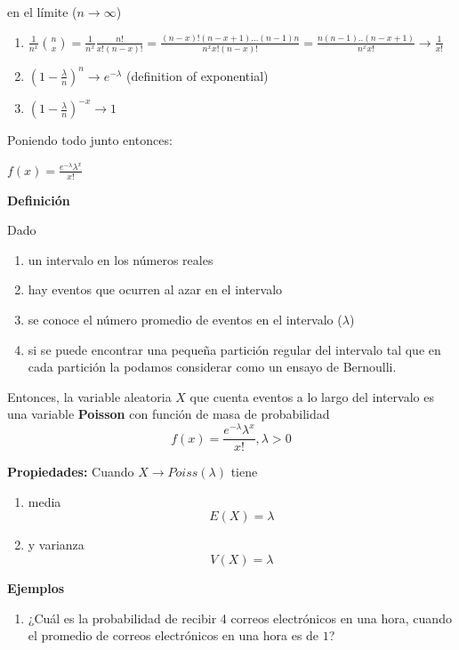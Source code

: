 \documentclass[
]{book}
\providecommand{\tightlist}{%
  \setlength{\itemsep}{0pt}\setlength{\parskip}{0pt}}
\begin{document}
en el límite (\(n \rightarrow \infty\))

\begin{enumerate}
\def\labelenumi{\arabic{enumi})}
\tightlist
\item
  \(\frac{1}{n^x}\binom n x =\frac{1}{n^x}\frac{n!}{x! (n-x)!}=\frac{(n-x)!(n-x+1)...(n-1)n}{n^x x! (n-x)!}=\frac{n(n-1)..(n-x+1)}{n^x x!} \rightarrow \frac{1}{x!}\)
\item
  \((1-\frac{\lambda}{n})^{n} \rightarrow e^{-\lambda}\) (definition of exponential)
\item
  \((1-\frac{\lambda}{n})^{-x} \rightarrow 1\)
\end{enumerate}

Poniendo todo junto entonces:

\(f(x)= \frac{e^{-\lambda}\lambda^x}{x!}\)

\textbf{Definición}

Dado

\begin{enumerate}
\def\labelenumi{\arabic{enumi})}
\tightlist
\item
  un intervalo en los números reales
\item
  hay eventos que ocurren al azar en el intervalo
\item
  se conoce el número promedio de eventos en el intervalo (\(\lambda\))
\item
  si se puede encontrar una pequeña partición regular del intervalo tal que en cada partición la podamos considerar como un ensayo de Bernoulli.
\end{enumerate}

Entonces, la variable aleatoria \(X\) que cuenta eventos a lo largo del intervalo es una variable \textbf{Poisson} con función de masa de probabilidad
\[f(x)= \frac{e^{-\lambda}\lambda^x}{x!}, \lambda>0\]

\textbf{Propiedades:}
Cuando \(X \rightarrow Poiss(\lambda)\) tiene

\begin{enumerate}
\def\labelenumi{\arabic{enumi})}
\tightlist
\item
  media \[E(X)= \lambda\]
\item
  y varianza \[V(X)= \lambda\]
\end{enumerate}

\textbf{Ejemplos}

\begin{enumerate}
\def\labelenumi{\arabic{enumi})}
\tightlist
\item
  ¿Cuál es la probabilidad de recibir 4 correos electrónicos en una hora, cuando el promedio de correos electrónicos en una hora es de \(1\)?
\end{enumerate}
\end{document}
